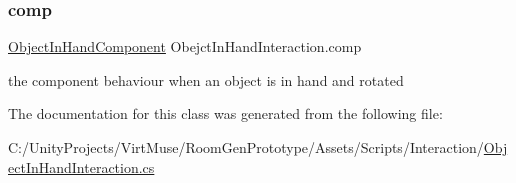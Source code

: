 \subsubsection{\texorpdfstring{comp}{comp}}
{\footnotesize\ttfamily \mbox{\hyperlink{class_object_in_hand_component}{Object\+In\+Hand\+Component}} Obejct\+In\+Hand\+Interaction.\+comp\hspace{0.3cm}{\ttfamily [private]}}



the component behaviour when an object is in hand and rotated 



The documentation for this class was generated from the following file\+:\begin{DoxyCompactItemize}
\item 
C\+:/\+Unity\+Projects/\+Virt\+Muse/\+Room\+Gen\+Prototype/\+Assets/\+Scripts/\+Interaction/\mbox{\hyperlink{_object_in_hand_interaction_8cs}{Object\+In\+Hand\+Interaction.\+cs}}\end{DoxyCompactItemize}
